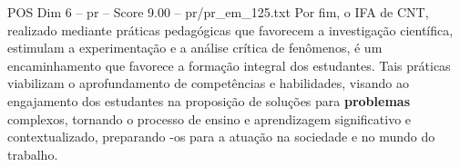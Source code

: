 \begin{textsample}{POS Dim 6 – pr – Score 9.00 – pr/pr\_em\_125.txt}
Por fim, o IFA de CNT, realizado mediante práticas pedagógicas que favorecem a investigação científica, estimulam a experimentação e a análise crítica de fenômenos, é um encaminhamento que favorece a formação integral dos estudantes.
Tais práticas viabilizam o aprofundamento de competências e habilidades, visando ao engajamento dos estudantes na proposição de soluções para \textbf{problemas} complexos, tornando o processo de ensino e aprendizagem significativo e contextualizado, preparando -os para a atuação na sociedade e no mundo do trabalho.

\end{textsample}
